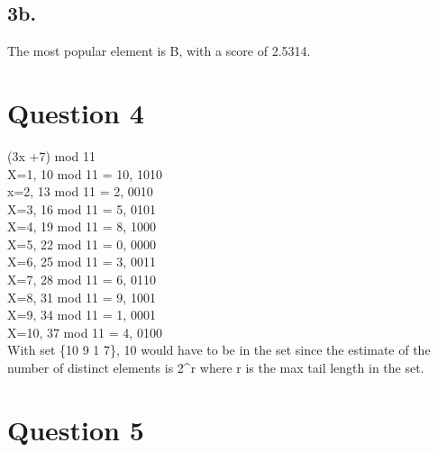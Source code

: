 \documentclass{article}
\begin{document}
\subsection{3b.}
The most popular element is B, with a score of 2.5314.

\section{Question 4}

(3x +7) mod 11\\
X=1, 10 mod 11 = 10, 1010\\
x=2, 13 mod 11 = 2, 0010\\
X=3, 16 mod 11 = 5, 0101\\
X=4, 19 mod 11 = 8, 1000\\
X=5, 22 mod 11 = 0, 0000\\
X=6, 25 mod 11 = 3, 0011\\
X=7, 28 mod 11 = 6, 0110\\
X=8, 31 mod 11 = 9, 1001\\
X=9, 34 mod 11 = 1, 0001\\
X=10, 37 mod 11 = 4, 0100\\

\noindent With set \{10 9 1 7\}, 10 would have to be in the set since the estimate of the number of distinct elements is 2\textasciicircum r where r is the max tail length in the set.

\section{Question 5}

\begin{center}
\end{center}
\end{document}
